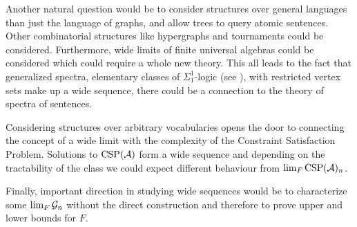Another natural question would be to consider structures over general languages than just the language of graphs, and allow trees to query atomic sentences. Other combinatorial structures like hypergraphs and tournaments could be considered. Furthermore, wide limits of finite universal algebras could be considered which could require a whole new theory. This all leads to the fact that generalized spectra, elementary classes of $\Sigma_1^1$-logic (see \cite{Fagin74}), with restricted vertex sets make up a wide sequence, there could be a connection to the theory of spectra of sentences.


Considering structures over arbitrary vocabularies opens the door to connecting the concept of a wide limit with the complexity of the Constraint Satisfaction Problem. Solutions to $\text{CSP}(\mathcal{A})$ form a wide sequence and depending on the tractability of the class we could expect different behaviour from $\lim_{F}\text{CSP}(\mathcal{A})_n$.

Finally, important direction in studying wide sequences would be to characterize some $\lim_F\mathcal{G}_n$ without the direct construction and therefore to prove upper and lower bounds for $F$.
